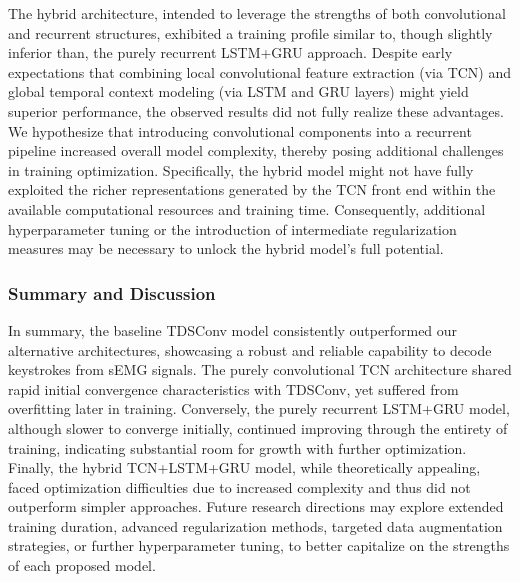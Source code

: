 The hybrid architecture, intended to leverage the strengths of both convolutional and recurrent structures, exhibited a training profile similar to, though slightly inferior than, the purely recurrent LSTM+GRU approach. Despite early expectations that combining local convolutional feature extraction (via TCN) and global temporal context modeling (via LSTM and GRU layers) might yield superior performance, the observed results did not fully realize these advantages. We hypothesize that introducing convolutional components into a recurrent pipeline increased overall model complexity, thereby posing additional challenges in training optimization. Specifically, the hybrid model might not have fully exploited the richer representations generated by the TCN front end within the available computational resources and training time. Consequently, additional hyperparameter tuning or the introduction of intermediate regularization measures may be necessary to unlock the hybrid model’s full potential.

    
\subsubsection{Summary and Discussion}

In summary, the baseline TDSConv model consistently outperformed our alternative architectures, showcasing a robust and reliable capability to decode keystrokes from sEMG signals. The purely convolutional TCN architecture shared rapid initial convergence characteristics with TDSConv, yet suffered from overfitting later in training. Conversely, the purely recurrent LSTM+GRU model, although slower to converge initially, continued improving through the entirety of training, indicating substantial room for growth with further optimization. Finally, the hybrid TCN+LSTM+GRU model, while theoretically appealing, faced optimization difficulties due to increased complexity and thus did not outperform simpler approaches. Future research directions may explore extended training duration, advanced regularization methods, targeted data augmentation strategies, or further hyperparameter tuning, to better capitalize on the strengths of each proposed model.
